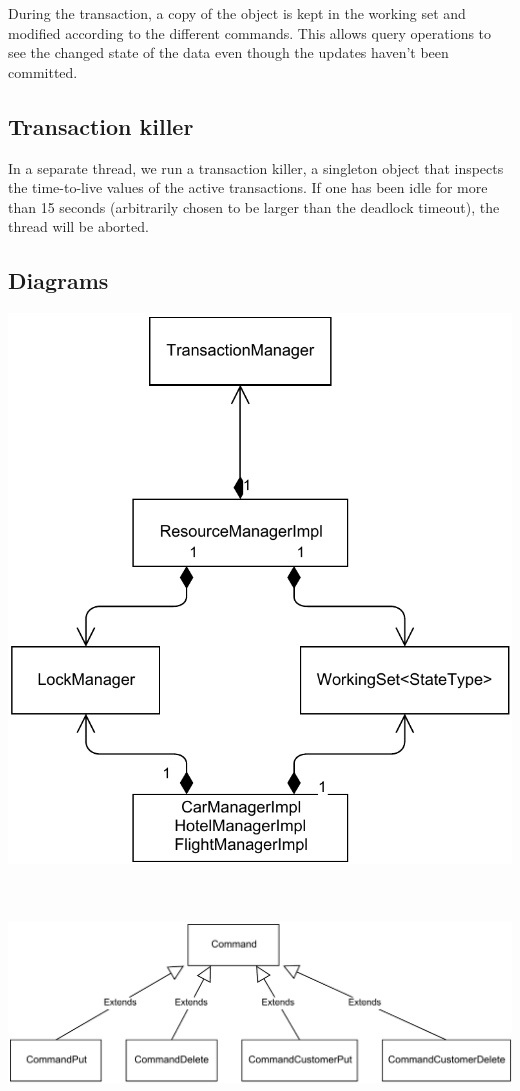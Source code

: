 \documentclass[10pt]{article}
\begin{document}
During the transaction, a copy of the object is kept in the working
set and modified according to the different commands.  This allows
query operations to see the changed state of the data even though the
updates haven't been committed.

\subsection{Transaction killer}

In a separate thread, we run a transaction killer, a singleton object
that inspects the time-to-live values of the active transactions.  If
one has been idle for more than 15 seconds (arbitrarily chosen to be
larger than the deadlock timeout), the thread will be aborted.

\subsection{Diagrams}

\begin{center}
\includegraphics[scale=0.6]{class_diagram.pdf}

~\\~ \\

\includegraphics[scale=0.5]{command_hierarchy.pdf}
\end{center}
\end{document}
